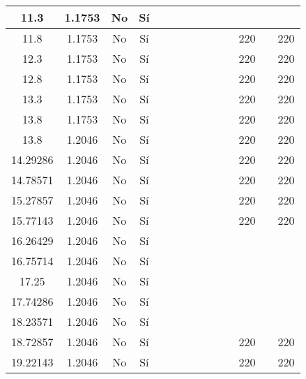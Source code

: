 \begin{table}[H]
{\begin{tabular}{|c|c|c|c|c|c|c|c|c|c|c|c|c|c|}
\hline
11.3 & 1.1753 & No  & Sí  &     &     &     &     &     &     &     &     &     &  \bigstrut\\
\hline
11.8 & 1.1753 & No  & Sí  &     &     &     &     &     &     &     & 220 &     & 220 \bigstrut\\
\hline
12.3 & 1.1753 & No  & Sí  &     &     &     &     &     &     &     & 220 &     & 220 \bigstrut\\
\hline
12.8 & 1.1753 & No  & Sí  &     &     &     &     &     &     &     & 220 &     & 220 \bigstrut\\
\hline
13.3 & 1.1753 & No  & Sí  &     &     &     &     &     &     &     & 220 &     & 220 \bigstrut\\
\hline
13.8 & 1.1753 & No  & Sí  &     &     &     &     &     &     &     & 220 &     & 220 \bigstrut\\
\hline
13.8 & 1.2046 & No  & Sí  &     &     &     &     &     &     &     & 220 &     & 220 \bigstrut\\
\hline
14.29286 & 1.2046 & No  & Sí  &     &     &     &     &     &     &     & 220 &     & 220 \bigstrut\\
\hline
14.78571 & 1.2046 & No  & Sí  &     &     &     &     &     &     &     & 220 &     & 220 \bigstrut\\
\hline
15.27857 & 1.2046 & No  & Sí  &     &     &     &     &     &     &     & 220 &     & 220 \bigstrut\\
\hline
15.77143 & 1.2046 & No  & Sí  &     &     &     &     &     &     &     & 220 &     & 220 \bigstrut\\
\hline
16.26429 & 1.2046 & No  & Sí  &     &     &     &     &     &     &     &     &     &  \bigstrut\\
\hline
16.75714 & 1.2046 & No  & Sí  &     &     &     &     &     &     &     &     &     &  \bigstrut\\
\hline
17.25 & 1.2046 & No  & Sí  &     &     &     &     &     &     &     &     &     &  \bigstrut\\
\hline
17.74286 & 1.2046 & No  & Sí  &     &     &     &     &     &     &     &     &     &  \bigstrut\\
\hline
18.23571 & 1.2046 & No  & Sí  &     &     &     &     &     &     &     &     &     &  \bigstrut\\
\hline
18.72857 & 1.2046 & No  & Sí  &     &     &     &     &     &     &     & 220 &     & 220 \bigstrut\\
\hline
19.22143 & 1.2046 & No  & Sí  &     &     &     &     &     &     &     & 220 &     & 220 \bigstrut\\

\end{tabular}}
\end{table}
